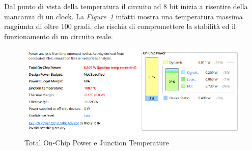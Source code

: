 Dal punto di vista della temperatura il circuito ad 8 bit inizia a risentire della mancanza di un clock. La \textit{Figure~\ref{8bit_power}} infatti mostra una temperatura massima raggiunta di oltre
100 gradi, che rischia di compromettere la stabilità ed il funzionamento di un circuito reale.
\begin{figure}[ht]
  \centering
  \includegraphics[width=1\textwidth]{assets/simulations/Post_Implementation/8bit/power.png}
  \caption{Total On-Chip Power e Junction Temperature}
  \label{8bit_power} 
\end{figure}
\FloatBarrier


